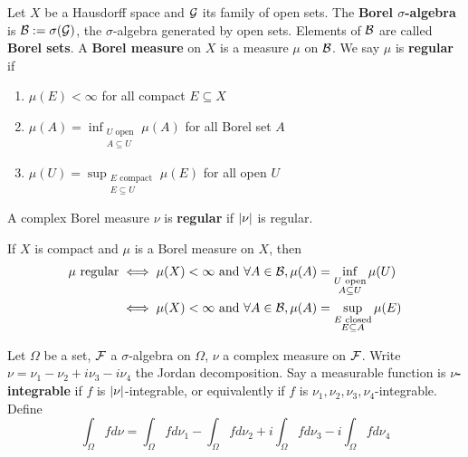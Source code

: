 \documentclass{article}
\begin{document}
\begin{defi}
  Let $X$ be a Hausdorff space and $\mathcal G$ its family of open sets. The {\bf Borel $\sigma$-algebra} is $\mathcal B := \sigma(\mathcal G)$, the $\sigma$-algebra generated by open sets. Elements of $\mathcal B$ are called {\bf Borel sets}. A {\bf Borel measure} on $X$ is a measure $\mu$ on $\mathcal B$. We say $\mu$ is {\bf regular} if
  \begin{enumerate}
    \item $\mu(E) < \infty$ for all compact $E \subseteq X$
    \item $\mu(A) = \inf_{\substack{U \text{ open} \\ A \subseteq U}} \mu(A)$ for all Borel set $A$
    \item $\mu(U) = \sup_{\substack{E \text{ compact} \\ E \subseteq U}} \mu(E)$ for all open $U$
  \end{enumerate}
  A complex Borel measure $\nu$ is {\bf regular} if $\left\lvert \nu\right\rvert$ is regular.
\end{defi}

If $X$ is compact and $\mu$ is a Borel measure on $X$, then
\begin{align*}
  \mu \text{ regular}
  & \iff \mu(X) < \infty \text{ and } \forall A \in \mathcal B, \mu(A) = \inf_{\substack{U \text{ open} \\ A \subseteq U}} \mu(U) \\
  & \iff \mu(X) < \infty \text{ and } \forall A \in \mathcal B, \mu(A) = \sup_{\substack{E \text{ closed} \\ E \subseteq A}} \mu(E)
\end{align*}

\begin{defi}
  Let $\Omega$ be a set, $\mathcal F$ a $\sigma$-algebra on $\Omega$, $\nu$ a complex measure on $\mathcal F$. Write $\nu = \nu_1 - \nu_2 + i\nu_3 - i\nu_4$ the Jordan decomposition. Say a measurable function is {\bf $\nu$-integrable} if $f$ is $\left\lvert \nu\right\rvert$-integrable, or equivalently if $f$ is $\nu_1, \nu_2, \nu_3, \nu_4$-integrable. Define
  $$\int_\Omega f d\nu = \int_\Omega f d\nu_1 - \int_\Omega f d\nu_2 + i\int_\Omega f d\nu_3 - i\int_\Omega f d\nu_4$$
\end{defi}

\newlec
\end{document}
